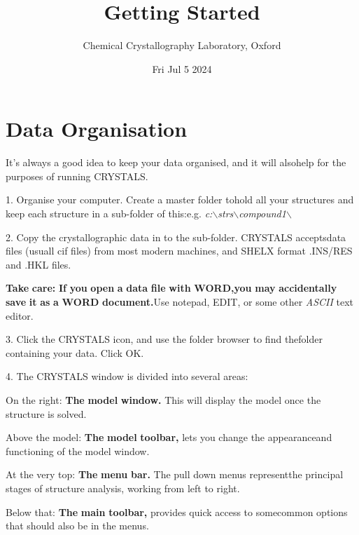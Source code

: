 \documentclass[10pt,a4paper]{report}
\begin{document}
\lhead{\slshape \rightmark}
\chead{}
\rhead{\thepage}
\cfoot{}
\rfoot{}
\renewcommand{\headrulewidth}{0pt}
\renewcommand{\footrulewidth}{0pt}
\fancypagestyle{plain}{%
\fancyhf{}
\fancyfoot[L]{Fri Jul  5  2024}
\fancyfoot[C]{\thepage}
\renewcommand{\headrulewidth}{0pt}
\renewcommand{\footrulewidth}{0pt}}
\newcommand{\Instruction}[1]{{\bf #1}}
\newcommand{\Directive}[1]{{\bf \emph{#1}}}
\newcommand{\Keyword}[1]{\emph{#1}}
\sloppy
\title{Getting Started}
\author{Chemical Crystallography Laboratory, Oxford}
\date{Fri Jul  5  2024}
\maketitle
\tableofcontents
\chapter{Data Organisation}
It's always a good idea to keep your data organised, and it will alsohelp for the purposes of running CRYSTALS.

1. Organise your computer. Create a master folder tohold all your structures and keep each structure in a sub-folder of this:e.g. \emph{c:$\backslash$strs$\backslash$compound1$\backslash$}

2. Copy the crystallographic data in to the sub-folder. CRYSTALS acceptsdata files (usuall cif files) from most modern machines, and SHELX format .INS/RES and .HKL files.

{\bf Take} {\bf care:} {\bf If} {\bf you} {\bf open} {\bf a} {\bf data} {\bf file} {\bf with} {\bf WORD,}{\bf you} {\bf may} {\bf accidentally} {\bf save} {\bf it} {\bf as} {\bf a} {\bf WORD} {\bf document.}Use notepad, EDIT, or some other \emph{ASCII} text editor.

3. Click the CRYSTALS icon, and use the folder browser to find thefolder containing your data. Click OK.

4. The CRYSTALS window is divided into several areas:

 On the right: {\bf The} {\bf model} {\bf window.} This will display the model once the structure is solved.

 Above the model: {\bf The} {\bf model} {\bf toolbar,} lets you change the appearanceand functioning of the model window.

 At the very top: {\bf The} {\bf menu} {\bf bar.} The pull down menus representthe principal stages of structure analysis, working from left to right.

 Below that: {\bf The} {\bf main} {\bf toolbar,} provides quick access to somecommon options that should also be in the menus.
\end{document}
